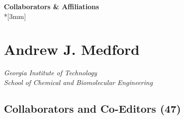 \renewcommand{\LeftFooter}{Collaborators \& Affiliations}
\renewcommand{\PageLimit}{0}
\begin{center}
{\bf Collaborators \& Affiliations} \\*[3mm]
\end{center}

\setcounter{section}{0}

\section{Andrew J. Medford}

\emph{Georgia Institute of Technology}\\\emph{School of Chemical and
Biomolecular Engineering}

\subsection{Collaborators and Co-Editors
(47)}\label{collaborators-and-co-editors-47}

